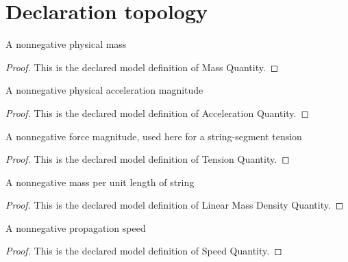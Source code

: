 \section{Declaration topology}
\begin{definition}
  \label{def:physics:phyx-mini-0292:phyxminiproblems-problemphyxmini0292-massquantity}
  A nonnegative physical mass
\end{definition}
\begin{proof}
  This is the declared model definition of Mass Quantity.
\end{proof}
\begin{definition}
  \label{def:physics:phyx-mini-0292:phyxminiproblems-problemphyxmini0292-accelerationquantity}
  A nonnegative physical acceleration magnitude
\end{definition}
\begin{proof}
  This is the declared model definition of Acceleration Quantity.
\end{proof}
\begin{definition}
  \label{def:physics:phyx-mini-0292:phyxminiproblems-problemphyxmini0292-tensionquantity}
  A nonnegative force magnitude, used here for a string-segment tension
\end{definition}
\begin{proof}
  This is the declared model definition of Tension Quantity.
\end{proof}
\begin{definition}
  \label{def:physics:phyx-mini-0292:phyxminiproblems-problemphyxmini0292-linearmassdensityquantity}
  A nonnegative mass per unit length of string
\end{definition}
\begin{proof}
  This is the declared model definition of Linear Mass Density Quantity.
\end{proof}
\begin{definition}
  \label{def:physics:phyx-mini-0292:phyxminiproblems-problemphyxmini0292-speedquantity}
  A nonnegative propagation speed
\end{definition}
\begin{proof}
  This is the declared model definition of Speed Quantity.
\end{proof}
